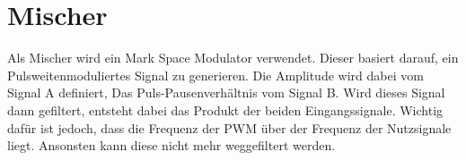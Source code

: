 \section{Mischer}
Als Mischer wird ein Mark Space Modulator \cite{???} verwendet. Dieser 
basiert darauf, ein Pulsweitenmoduliertes Signal zu generieren. Die Amplitude 
wird dabei vom Signal A definiert, Das Puls-Pausenverhältnis vom Signal B. 
Wird dieses Signal dann gefiltert, entsteht dabei das Produkt der beiden 
Eingangssignale. Wichtig dafür ist jedoch, dass die Frequenz der PWM über 
der Frequenz der Nutzsignale liegt. Ansonsten kann diese nicht mehr 
weggefiltert werden. 
